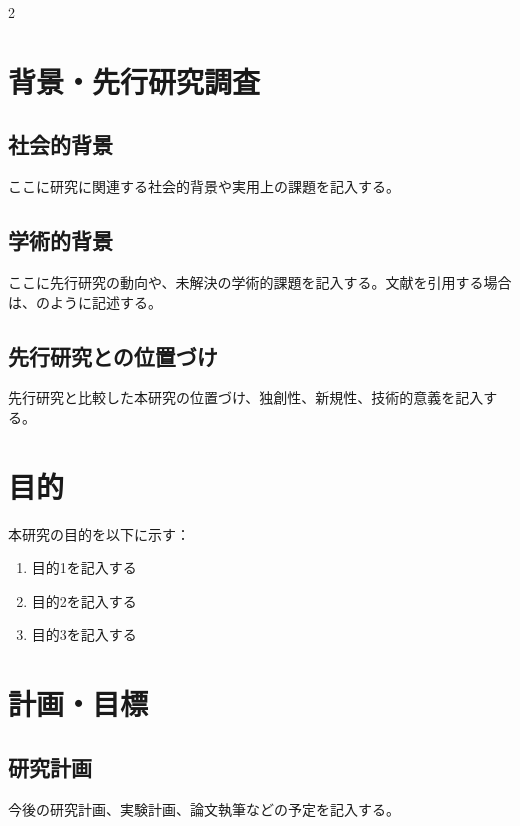 \documentclass[uplatex,dvipdfmx,a4j,9pt]{jsarticle}
\begin{document}
\begin{multicols}{2}

\section{背景・先行研究調査}

\subsection{社会的背景}
ここに研究に関連する社会的背景や実用上の課題を記入する。

\subsection{学術的背景}
ここに先行研究の動向や、未解決の学術的課題を記入する。文献を引用する場合は、\cite{reference1}のように記述する。

\subsection{先行研究との位置づけ}
先行研究と比較した本研究の位置づけ、独創性、新規性、技術的意義を記入する。

\section{目的}
本研究の目的を以下に示す：
\begin{enumerate}
  \item 目的1を記入する
  \item 目的2を記入する
  \item 目的3を記入する
\end{enumerate}

\section{計画・目標}

\subsection{研究計画}
今後の研究計画、実験計画、論文執筆などの予定を記入する。



\end{multicols}
\end{document}
